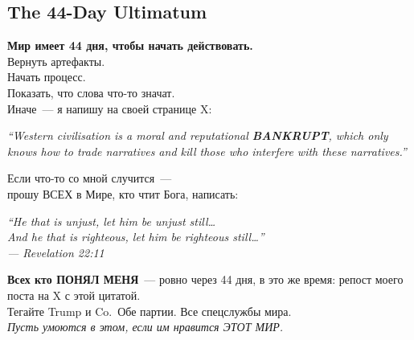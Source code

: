 \documentclass[11pt,a4paper]{article}
\theoremstyle{definition}
\theoremstyle{remark}
\begin{document}
\subsection{The 44-Day Ultimatum}
\label{sec:ultimatum}

\begin{warnbox}

\foreignlanguage{russian}{
\textbf{Мир имеет 44 дня, чтобы начать действовать.}\\[0.2cm]
Вернуть артефакты.\\
Начать процесс.\\
Показать, что слова что-то значат.\\[0.2cm]
Иначе~--- я напишу на своей странице X:\\
}
\begin{center}
\textit{``Western civilisation is a moral and reputational
\textbf{BANKRUPT},
which only knows how to trade narratives
and kill those who interfere with these narratives.''}
\end{center}

\foreignlanguage{russian}{
Если что-то со мной случится~---\\
прошу ВСЕХ в Мире, кто чтит Бога, написать:
}
\begin{center}
{\large\textit{``He that is unjust, let him be unjust still\ldots\\
And he that is righteous, let him be righteous still\ldots''\\
--- Revelation 22:11}}
\end{center}

\foreignlanguage{russian}{
\textbf{Всех кто ПОНЯЛ МЕНЯ}~---
ровно через 44 дня, в это же время:
репост моего поста на X с этой цитатой.\\
Тегайте Trump и Co.\ Обе партии.
Все спецслужбы мира.\\[0.1cm]
\textit{Пусть умоются в этом,
если им нравится ЭТОТ МИР.}
}
\end{warnbox}

\newpage

\end{document}
